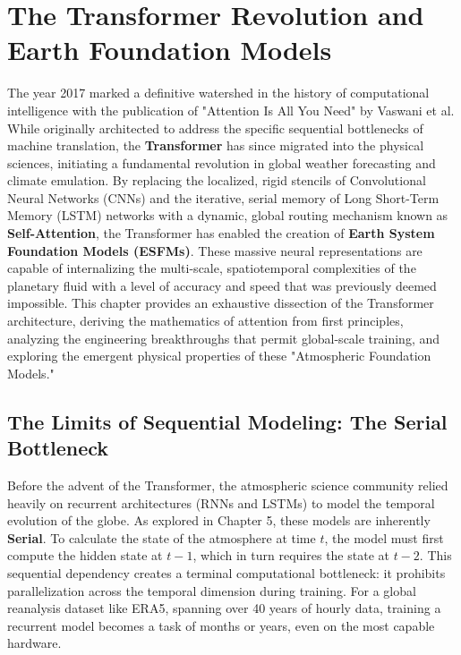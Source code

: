 \chapter{The Transformer Revolution and Earth Foundation Models}

The year 2017 marked a definitive watershed in the history of computational intelligence with the publication of "Attention Is All You Need" by Vaswani et al. While originally architected to address the specific sequential bottlenecks of machine translation, the \textbf{Transformer} has since migrated into the physical sciences, initiating a fundamental revolution in global weather forecasting and climate emulation. By replacing the localized, rigid stencils of Convolutional Neural Networks (CNNs) and the iterative, serial memory of Long Short-Term Memory (LSTM) networks with a dynamic, global routing mechanism known as \textbf{Self-Attention}, the Transformer has enabled the creation of \textbf{Earth System Foundation Models (ESFMs)}. These massive neural representations are capable of internalizing the multi-scale, spatiotemporal complexities of the planetary fluid with a level of accuracy and speed that was previously deemed impossible. This chapter provides an exhaustive dissection of the Transformer architecture, deriving the mathematics of attention from first principles, analyzing the engineering breakthroughs that permit global-scale training, and exploring the emergent physical properties of these "Atmospheric Foundation Models."

\section{The Limits of Sequential Modeling: The Serial Bottleneck}

Before the advent of the Transformer, the atmospheric science community relied heavily on recurrent architectures (RNNs and LSTMs) to model the temporal evolution of the globe. As explored in Chapter 5, these models are inherently \textbf{Serial}. To calculate the state of the atmosphere at time $t$, the model must first compute the hidden state at $t-1$, which in turn requires the state at $t-2$. This sequential dependency creates a terminal computational bottleneck: it prohibits parallelization across the temporal dimension during training. For a global reanalysis dataset like ERA5, spanning over 40 years of hourly data, training a recurrent model becomes a task of months or years, even on the most capable hardware.

